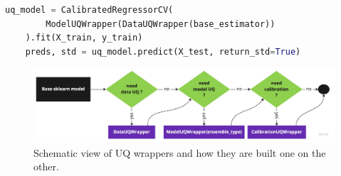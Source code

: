 \begin{lstlisting}[language=Python, caption=Extraction of uncertainty scores from predictions.]
    uq_model = CalibratedRegressorCV(
        ModelUQWrapper(DataUQWrapper(base_estimator))
    ).fit(X_train, y_train)
    preds, std = uq_model.predict(X_test, return_std=True)
\end{lstlisting}







\begin{figure}[h!]
    \centering
    \includegraphics[width=.8\linewidth]{figures/implementation/diagram-sequence-wrappers.jpg}
    \caption{Schematic view of UQ wrappers and how they are built one on the other.}
    \label{fig:diagram-uq-wrappers}
\end{figure}


